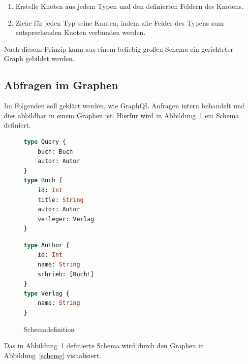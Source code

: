 \begin{enumerate}
    \item Erstelle Knoten aus jedem Typen und den definierten Feldern des Knotens.
    \item Ziehe für jeden Typ seine Kanten, indem alle Felder des Typens zum entsprechenden Knoten verbunden werden.
\end{enumerate}
Nach diesem Prinzip kann aus einem beliebig großen Schema ein gerichteter Graph gebildet werden.
\newpage


\subsection{Abfragen im Graphen}
\label{abfrgraph}

Im Folgenden soll geklärt werden, wie GraphQL Anfragen intern behandelt und dies abbildbar in einem Graphen ist.
Hierfür wird in Abbildung~\ref{schemdef} ein Schema definiert.

\begin{figure}[htb]
    \centering
    \begin{minipage}[h!tb]{0.4\textwidth}
        \begin{lstlisting}[language=GraphQL]
type Query {
    buch: Buch
    autor: Autor
}
type Buch {
    id: Int
    title: String
    autor: Autor
    verleger: Verlag
}
        \end{lstlisting}
    \end{minipage}
    \hfill
    \begin{minipage}[h!tb]{0.4\textwidth}
        \begin{lstlisting}[language=GraphQL]
type Author {
    id: Int
    name: String
    schrieb: [Buch!]
}
type Verlag {
    name: String
}
        \end{lstlisting}
    \end{minipage}
    \caption{Schemadefinition}
    \label{schemdef}
\end{figure}

Das in Abbildung~\ref{schemdef} definierte Schema wird durch den Graphen in Abbildung~\ref{schemg} visualisiert.

